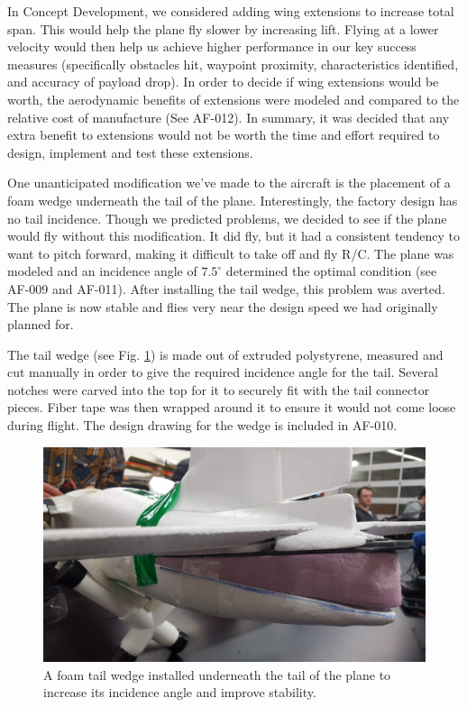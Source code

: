 \documentclass[]{auvsi_doc}
\begin{document}
In Concept Development, we considered adding wing extensions to increase total span. This would help the plane fly slower by increasing lift. Flying at a lower velocity would then help us achieve higher performance in our key success measures (specifically obstacles hit, waypoint proximity, characteristics identified, and accuracy of payload drop). In order to decide if wing extensions would be worth, the aerodynamic benefits of extensions were modeled and compared to the relative cost of manufacture (See AF-012). In summary, it was decided that any extra benefit to extensions would not be worth the time and effort required to design, implement and test these extensions.

One unanticipated modification we've made to the aircraft is the placement of a foam wedge underneath the tail of the plane. Interestingly, the factory design has no tail incidence. Though we predicted problems, we decided to see if the plane would fly without this modification. It did fly, but it had a consistent tendency to want to pitch forward, making it difficult to take off and fly R/C. The plane was modeled and an incidence angle of $7.5^\circ$ determined the optimal condition (see AF-009 and AF-011). After installing the tail wedge, this problem was averted. The plane is now stable and flies very near the design speed we had originally planned for.

The tail wedge (see Fig. \ref{fig:wedge}) is made out of extruded polystyrene, measured and cut manually in order to give the required incidence angle for the tail. Several notches were carved into the top for it to securely fit with the tail connector pieces. Fiber tape was then wrapped around it to ensure it would not come loose during flight. The design drawing for the wedge is included in AF-010.

\begin{figure}[h!]
	\centering
	\includegraphics[width=.75\columnwidth]{figs/tailwedge}
	\caption{A foam tail wedge installed underneath the tail of the plane to increase its incidence angle and improve stability.}
	\label{fig:wedge}
\end{figure}
\end{document}
